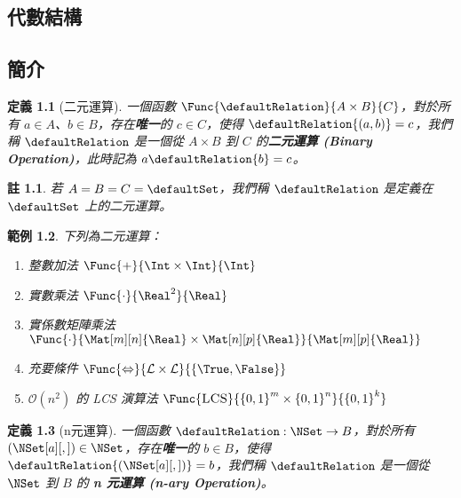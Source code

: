 \documentclass[12pt,a4paper,oneside]{report}
\begin{document}
\begin{CJK}{UTF8}{bkai}
\newtheorem{mydef}{定義}[chapter]
\newtheorem*{mydef*}{定義}
\newtheorem{myrule}[mydef]{原理}
\newtheorem{mythm}[mydef]{定理}
\newtheorem{mypropo}[mydef]{性質}
\newtheorem{mycorol}[mydef]{推論}
\newtheorem{myexample}[mydef]{範例}
\newtheorem*{mynote*}{註}
\renewenvironment{proof}{\textbf{證明}}{\qed}
\newenvironment{mysol}{\textbf{解答}}{\qed}


\fi

\chapter{代數結構}
\section{簡介}

\begin{mydef}[二元運算]
\label{def:algebra:binary_operation}
一個函數 $\Func{\defaultRelation}{A\times{B}}{C}$，對於所有 $a\in{A}$、$b\in{B}$，存在\textbf{唯一}的 $c\in{C}$，使得 $\defaultRelation{(a,b)}=c$，我們稱 $\defaultRelation$ 是一個從 $A\times{B}$ 到 $C$ 的\textbf{二元運算 (Binary Operation)}，此時記為 $a\defaultRelation{b}=c$。
\end{mydef}
\begin{mynote*}
若 $A=B=C=\defaultSet$，我們稱 $\defaultRelation$ 是定義在 $\defaultSet$ 上的二元運算。
\end{mynote*}

\begin{myexample}下列為二元運算：
\begin{enumerate}
\item 整數加法 $\Func{+}{\Int\times{\Int}}{\Int}$
\item 實數乘法 $\Func{\cdot}{\Real^2}{\Real}$
\item 實係數矩陣乘法 $\Func{\cdot}{\Mat[m][n]{\Real}\times\Mat[n][p]{\Real}}{\Mat[m][p]{\Real}}$
\item 充要條件 $\Func{\Leftrightarrow}{\mathcal{L}\times{\mathcal{L}}}{\left\{{\True,\False}\right\}}$
\item $\mathcal{O}{(n^2)}$ 的 LCS 演算法 $\Func{\textsc{LCS}}{{{\{0,1\}}^{m}}\times{{\{0,1\}}^{n}}}{{\{0,1\}}^{k}}$
\end{enumerate}
\end{myexample}

\begin{mydef}[n元運算]
\label{def:algebra:n_ary_operation}
一個函數 $\defaultRelation: \NSet\rightarrow{B}$，對於所有 ${\left({\NSet[a][,]}\right)}\in{\NSet}$，存在\textbf{唯一}的 $b\in{B}$，使得 $\defaultRelation{\left({\NSet[a][,]}\right)}=b$，我們稱 $\defaultRelation$ 是一個從 $\NSet$ 到 $B$ 的\textbf{ n 元運算 (n-ary Operation)}。
\end{mydef}


\end{CJK}
\end{document}
